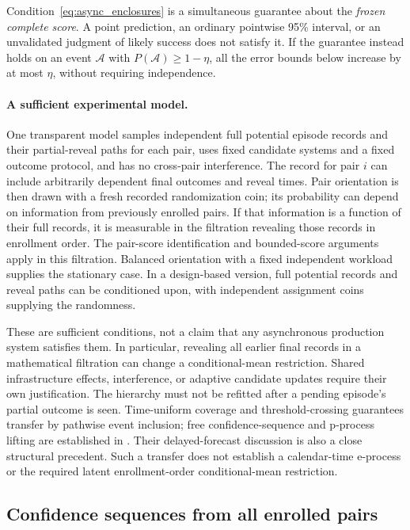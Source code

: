 Condition~\eqref{eq:async_enclosures} is a simultaneous guarantee about
the \emph{frozen complete score}. A point prediction, an ordinary
pointwise 95\% interval, or an unvalidated judgment of likely success
does not satisfy it. If the guarantee instead holds on an event
$\mathcal A$ with $P(\mathcal A)\geq1-\eta$, all the error bounds below
increase by at most $\eta$, without requiring independence.

\paragraph{A sufficient experimental model.}
One transparent model samples independent full potential episode records
and their partial-reveal paths for each pair, uses fixed candidate systems
and a fixed outcome protocol, and has no cross-pair interference. The
record for pair $i$ can include arbitrarily dependent final outcomes and
reveal times. Pair orientation is then drawn with a fresh recorded
randomization coin; its probability can depend on information from
previously enrolled pairs. If that information is a function of their
full records, it is measurable in the filtration revealing those records
in enrollment order. The pair-score identification and bounded-score
arguments apply in this filtration. Balanced orientation with a fixed
independent workload supplies the stationary case. In a design-based
version, full potential records and reveal paths can be conditioned upon,
with independent assignment coins supplying the randomness.

These are sufficient conditions, not a claim that any asynchronous
production system satisfies them. In particular, revealing all earlier
final records in a mathematical filtration can change a conditional-mean
restriction. Shared infrastructure effects, interference, or adaptive
candidate updates require their own justification. The hierarchy must
not be refitted after a pending episode's partial outcome is seen.
Time-uniform coverage and threshold-crossing guarantees transfer by
pathwise event inclusion; free confidence-sequence and p-process lifting
are established in \citet{choe2024filtrations}. Their delayed-forecast
discussion is also a close structural precedent. Such a transfer does
not establish a calendar-time e-process or the required latent
enrollment-order conditional-mean restriction.

\subsection{Confidence sequences from all enrolled pairs}

